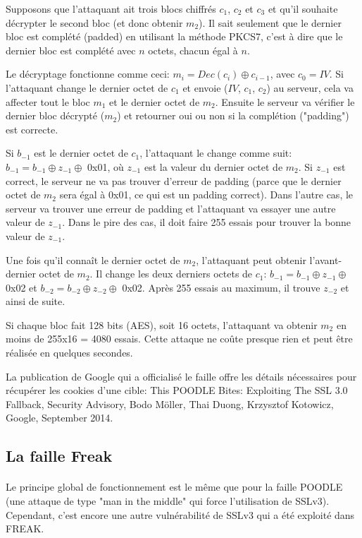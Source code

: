 Supposons que l'attaquant ait trois blocs chiffrés $c_1$, $c_2$ et $c_3$ et qu'il souhaite décrypter le second bloc (et donc obtenir $m_2$). Il sait seulement que le dernier bloc est complété (padded) en utilisant la méthode PKCS7, c'est à dire que le dernier bloc est complété avec $n$ octets, chacun égal à $n$.

Le décryptage fonctionne comme ceci: $m_i = Dec(c_i) \oplus c_{i-1}$, avec $c_0 = IV$. Si l'attaquant change le dernier octet de $c_1$ et envoie ($IV$, $c_1$, $c_2$) au serveur, cela va affecter tout le bloc $m_1$ et le dernier octet de $m_2$. Ensuite le serveur va vérifier le dernier bloc décrypté ($m_2$) et retourner oui ou non si la complétion ("padding") est correcte.

Si $b_{-1}$ est le dernier octet de $c_1$, l'attaquant le change comme suit: $b_{-1} = b_{-1} \oplus z_{-1} \oplus$ 0x01, où $z_{-1}$ est la valeur du dernier octet de $m_2$. Si $z_{-1}$ est correct, le serveur ne va pas trouver d'erreur de padding (parce que le dernier octet de $m_2$ sera égal à 0x01, ce qui est un padding correct). Dans l'autre cas, le serveur va trouver une erreur de padding et l'attaquant va essayer une autre valeur de $z_{-1}$. Dans le pire des cas, il doit faire 255 essais pour trouver la bonne valeur de $z_{-1}$.

Une fois qu'il conna\^it le dernier octet de $m_2$, l'attaquant peut obtenir l'avant-dernier octet de $m_2$. Il change les deux derniers octets de $c_1$: $b_{-1} = b_{-1} \oplus z_{-1} \oplus$ 0x02 et $b_{-2} = b_{-2} \oplus z_{-2} \oplus$ 0x02. Après 255 essais au maximum, il trouve $z_{-2}$ et ainsi de suite. 

Si chaque bloc fait 128 bits (AES), soit 16 octets, l'attaquant va obtenir $m_2$ en moins de 255x16 = 4080 essais. Cette attaque ne co\^ute presque rien et peut \^etre réalisée en quelques secondes.

La publication de Google qui a officialisé le faille offre les détails nécessaires pour récupérer les cookies d'une cible: This POODLE Bites: Exploiting The SSL 3.0 Fallback, Security Advisory, Bodo Möller, Thai Duong, Krzysztof Kotowicz, Google, September 2014.


\subsection{La faille Freak}
\paragraph{}
Le principe global de fonctionnement est le m\^eme que pour la faille POODLE (une attaque de type "man in the middle" qui force l'utilisation de SSLv3). Cependant, c'est encore une autre vulnérabilité de SSLv3 qui a été exploité dans FREAK.

